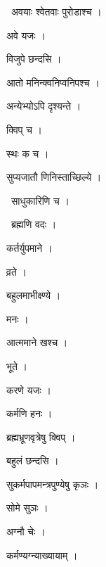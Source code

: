 \documentclass[10pt, openany, oneside]{book}
\begin{document}
\par\noindent\hspace{1.5em}{\vps वा॰}~{\qt अवयाः श्वेतवाः पुरोडाश्च ।}

\noindent अवे यजः ।

\noindent विजुपे छन्दसि ।

\noindent आतो मनिन्क्वनिप्वनिपश्च ।

\noindent अन्येभ्योऽपि दृश्यन्ते ।

\noindent क्विप् च ।

\noindent स्थः क च ।

\noindent सुप्यजातौ णिनिस्ताच्छिल्ये ।

\par\noindent\hspace{1.5em}{\vps वा॰}~{\qt साधुकारिणि च ।}

\par\noindent\hspace{1.5em}{\vps वा॰}~{\qt ब्रह्मणि वदः ।}

\noindent कर्तर्युपमाने ।

\noindent व्रते ।

\noindent बहुलमाभीक्ष्ण्ये ।

\noindent मनः ।

\noindent आत्ममाने खश्च ।

\noindent भूते ।

\noindent करणे यजः ।

\noindent कर्मणि हनः ।

\noindent ब्रह्मभ्रूणवृत्रेषु क्विप् ।

\noindent बहुलं छन्दसि ।

\noindent सुकर्मपापमन्त्रपुण्येषु कृञः ।

\noindent सोमे सुञः ।

\noindent अग्नौ चेः ।

\noindent कर्मण्यग्न्याख्यायाम् ।
\end{document}
